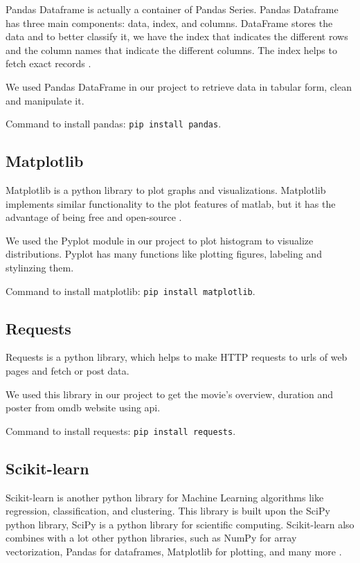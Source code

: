 Pandas Dataframe is actually a container of Pandas Series. Pandas Dataframe has three main components: data, index, and columns. DataFrame stores the data and to better classify it, we have the index that indicates the different rows and the column names that indicate the different columns. The index helps to fetch exact records \cite{pandas}.

We used Pandas DataFrame in our project to retrieve data in tabular form, clean and manipulate it.

Command to install pandas: \texttt{pip install pandas}.

\subsection{Matplotlib}

Matplotlib is a python library to plot graphs and visualizations. Matplotlib implements similar functionality to the plot features of matlab, but it has the advantage of being free and open-source \cite{matplotlib}. 

We used the Pyplot module in our project to plot histogram to visualize distributions. Pyplot has many functions like plotting figures, labeling and stylinzing them.

Command to install matplotlib: \texttt{pip install matplotlib}.

\subsection{Requests}

Requests is a python library, which helps to make HTTP requests to urls of web pages and fetch or post data.

We used this library in our project to get the movie's overview, duration and poster from omdb website using api.

Command to install requests: \texttt{pip install requests}.

\subsection{Scikit-learn}

Scikit-learn is another python library for Machine Learning algorithms like regression, classification, and clustering. This library is built upon the SciPy python library, SciPy is a python library for scientific computing.  Scikit-learn also combines with a lot other python libraries, such as NumPy for array vectorization, Pandas for dataframes, Matplotlib for plotting, and many more \cite{sk-learn}.

